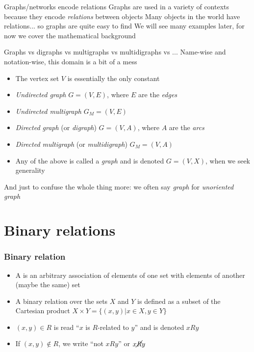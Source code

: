 \documentclass[aspectratio=169]{beamer}\usepackage[]{graphicx}\usepackage[]{xcolor}
\begin{document}
\begin{frame}{Graphs/networks encode relations}
	Graphs are used in a variety of contexts because they encode \emph{relations} between objects
	\vfill
	Many objects in the world have relations... so graphs are quite easy to find
	\vfill
	We will see many examples later, for now we cover the mathematical background
\end{frame}



\begin{frame}{Graphs vs digraphs vs multigraphs vs multidigraphs vs ...}
	Name-wise and notation-wise, this domain is a bit of a mess
	\vfill
	\begin{itemize}
		\item The vertex set $V$ is essentially the only constant
		\item \emph{Undirected graph} $G=(V,E)$, where $E$ are the \emph{edges}
		\item \emph{Undirected multigraph} $G_M=(V,E)$
		\item \emph{Directed graph} (or \emph{digraph}) $G=(V,A)$, where $A$ are the \emph{arcs}
		\item \emph{Directed multigraph} (or \emph{multidigraph}) $G_M=(V,A)$
		\item Any of the above is called a \emph{graph} and is denoted $G=(V,X)$, when we seek generality
	\end{itemize}
	\vfill
And just to confuse the whole thing more: we often say \emph{graph} for \emph{unoriented graph}
\end{frame}

\section{Binary relations}


\begin{frame}\frametitle{Binary relation}
	\begin{definition}
	\begin{itemize}
	\item A  is an arbitrary association of elements of one set with elements of another (maybe the same) set
	\item  A binary relation over the sets $X$ and $Y$ is defined as a subset of the Cartesian product $X\times Y =\{(x,y)| x\in X , y\in Y\}$
	\item $(x,y)\in R$ is read ``$x$ is $R$-related to $y$'' and is denoted $xRy$
	\item If $(x,y)\not\in R$, we write ``not $x R y$'' or $x\cancel{R} y$
	\end{itemize}
	\end{definition}
\end{frame}
	
\end{document}
